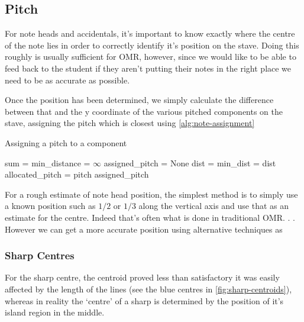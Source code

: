 \subsection{Pitch}
\label{sec:pitch-identification}

For note heads and accidentals, it's important to know exactly where the centre of the note lies in order to correctly identify it's position on the stave. Doing this roughly is usually sufficient for OMR, however, since we would like to be able to feed back to the student if they aren't putting their notes in the right place  we need to be as accurate as possible.

Once the position has been determined, we simply calculate the difference between that and the y coordinate of the various pitched components on the stave, assigning the pitch which is closest using \cref{alg:note-assignment}

\begin{algorithm}[H]
\caption{Assigning a pitch to a component}
\label{alg:note-assignment}
\begin{algorithmic}[1]
    \State sum = 
    \State min\_distance = $\infty$
    \State assigned\_pitch = None
      \State dist = 
        \State min\_dist = dist
        \State allocated\_pitch = pitch
      \EndIf
	\EndFor
	\Return assigned\_pitch
\EndProcedure
\end{algorithmic}
\end{algorithm}

For a rough estimate of note head position, the simplest method is to simply use a known position such as $1/2$ or $1/3$ along the vertical axis and use that as an estimate for the centre. Indeed that's often what is done in traditional OMR. . . However we can get a more accurate position using alternative techniques as 


\subsubsection{Sharp Centres}
For the sharp centre, the centroid proved less than satisfactory it was easily affected by the length of the lines (see the blue centres in \cref{fig:sharp-centroids}), whereas in reality the `centre' of a sharp is determined by the position of it's island region in the middle.

